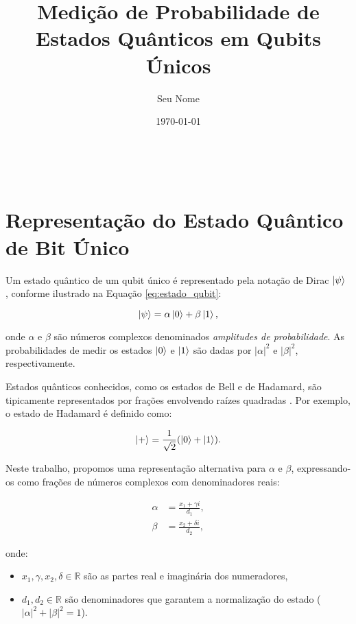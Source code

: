 \documentclass[12pt, a4paper]{article}
\title{Medição de Probabilidade de Estados Quânticos em Qubits Únicos}
\author{Seu Nome}
\date{\today}
\begin{document}
\

\maketitle

\section{Representação do Estado Quântico de Bit Único}
\label{sec:representacao}

Um estado quântico de um qubit único é representado pela notação de Dirac \(\ket{\psi}\) \cite{referencia1}, conforme ilustrado na Equação \eqref{eq:estado_qubit}:

\begin{equation}
\ket{\psi} = \alpha\ket{0} + \beta\ket{1},
\label{eq:estado_qubit}
\end{equation}

onde \(\alpha\) e \(\beta\) são números complexos denominados \textit{amplitudes de probabilidade}. As probabilidades de medir os estados \(\ket{0}\) e \(\ket{1}\) são dadas por \(|\alpha|^2\) e \(|\beta|^2\), respectivamente.

Estados quânticos conhecidos, como os estados de Bell e de Hadamard, são tipicamente representados por frações envolvendo raízes quadradas \cite{nielsen2010, preskill1998}. Por exemplo, o estado de Hadamard é definido como:

\begin{equation}
\ket{+} = \frac{1}{\sqrt{2}}(\ket{0} + \ket{1}).
\label{eq:hadamard}
\end{equation}

Neste trabalho, propomos uma representação alternativa para \(\alpha\) e \(\beta\), expressando-os como frações de números complexos com denominadores reais:

\begin{align}
\alpha &= \frac{x_1 + \gamma i}{d_1}, \label{eq:alpha} \\
\beta &= \frac{x_2 + \delta i}{d_2}, \label{eq:beta}
\end{align}

onde:
\begin{itemize}
\item \(x_1, \gamma, x_2, \delta \in \mathbb{R}\) são as partes real e imaginária dos numeradores,
\item \(d_1, d_2 \in \mathbb{R}\) são denominadores que garantem a normalização do estado (\(|\alpha|^2 + |\beta|^2 = 1\)).
\end{itemize}
\end{document}
